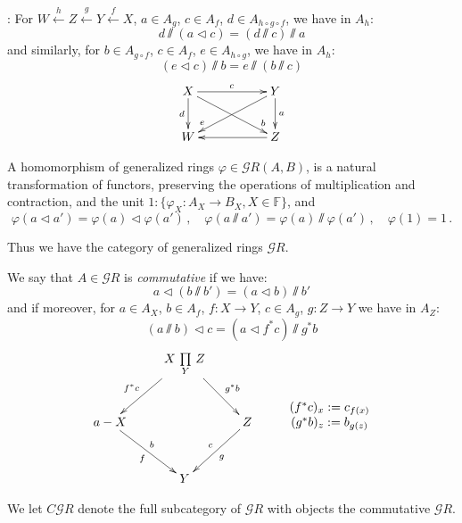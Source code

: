 \documentclass[leqno]{article}
\numberwithin{equation}{section}
\begin{document}
: For $W \xleftarrow{ \ h \ } Z \xleftarrow{ \ g \ } Y \xleftarrow{ \ f \ }X$, $a \in A_g$, $c \in A_f$, $d \in A_{h \circ g \circ f}$, we have in $A_h$:
\setcounter{equation}{10}
\begin{equation}
\label{eq311}
d \sslash (a \lhd c) = (d \sslash c) \sslash a
\end{equation}
and similarly, for $b \in A_{g \circ f}$, $c \in A_f$, $e \in A_{h \circ g}$, we have in $A_h$:
\begin{equation}
\label{eq312}
(e \lhd c) \sslash b = e \sslash (b \sslash c)
\end{equation}
$$
\xymatrix{
X \ar[rr]^c \ar[d]_-d \ar[rrd]^>>>b &&Y \ar[d]^-a \ar[lld]_>>>{e} \\
W &&Z \ar[ll]
}
$$

A homomorphism of generalized rings $\varphi \in {\mathcal G} R (A,B)$, is a natural transformation of functors, preserving the operations of multiplication and contraction, and the unit $1 : \{ \varphi_X : A_X \to B_X , X \in {\mathbb F}\}$, and
$$
\varphi (a \lhd a') = \varphi (a) \lhd \varphi (a') \, , \quad \varphi (a \sslash a') = \varphi (a) \sslash \varphi (a') \, , \quad \varphi (1) = 1 \, .
$$

Thus we have the category of generalized rings ${\mathcal G} R$.

\smallskip

We say that $A \in {\mathcal G} R$ is {\it commutative} if we have:
\begin{equation}
\label{eq313}
a \lhd (b \sslash b') = (a \lhd b) \sslash b'
\end{equation}
and if moreover, for $a \in A_X$, $b \in A_f$, $f : X \to Y$, $c \in A_g$, $g : Z \to Y$ we have in $A_Z$:
\begin{equation}
\label{eq314}
(a \sslash b) \lhd c = (a \lhd f^* c) \sslash g^* b 
\end{equation}
\begin{equation}
\label{eq315}
\xymatrix{
&X \ \underset{Y}{\prod} \ Z \ar[ld]_-{f^* c} \ar[rd]^-{g^* b} \\
a-X \ar[rd]_f^b &&Z \ar[ld]_c^g & 
\overset{\mbox{$(f^* c)_x := c_{f(x)}$}}{\mbox{$(g^* b)_z := b_{g(z)}$}} \\
&Y
} 
\end{equation}

We let $C{\mathcal G} R$ denote the full subcategory of ${\mathcal G} R$ with objects the commutative ${\mathcal G} R$. 

\smallskip
\end{document}
